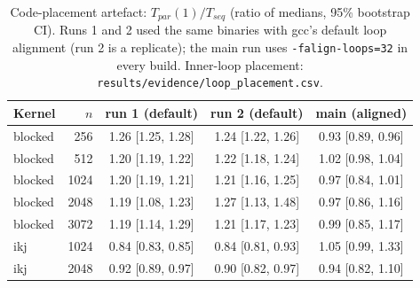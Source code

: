 \begin{table}[t]
\centering
\caption{Code-placement artefact: $T_{par}(1)/T_{seq}$ (ratio of medians, 95\% bootstrap CI). Runs 1 and 2 used the same binaries with gcc's default loop alignment (run 2 is a replicate); the main run uses \texttt{-falign-loops=32} in every build. Inner-loop placement: \texttt{results/evidence/loop\_placement.csv}.}
\label{tab:align}
\footnotesize
\setlength{\tabcolsep}{2.5pt}
\begin{tabular}{@{}lrccc@{}}
\toprule
Kernel & $n$ & run 1 (default) & run 2 (default) & main (aligned) \\
\midrule
blocked & 256 & 1.26 [1.25, 1.28] & 1.24 [1.22, 1.26] & 0.93 [0.89, 0.96] \\
blocked & 512 & 1.20 [1.19, 1.22] & 1.22 [1.18, 1.24] & 1.02 [0.98, 1.04] \\
blocked & 1024 & 1.20 [1.19, 1.21] & 1.21 [1.16, 1.25] & 0.97 [0.84, 1.01] \\
blocked & 2048 & 1.19 [1.08, 1.23] & 1.27 [1.13, 1.48] & 0.97 [0.86, 1.16] \\
blocked & 3072 & 1.19 [1.14, 1.29] & 1.21 [1.17, 1.23] & 0.99 [0.85, 1.17] \\
ikj & 1024 & 0.84 [0.83, 0.85] & 0.84 [0.81, 0.93] & 1.05 [0.99, 1.33] \\
ikj & 2048 & 0.92 [0.89, 0.97] & 0.90 [0.82, 0.97] & 0.94 [0.82, 1.10] \\
\bottomrule
\end{tabular}
\end{table}
